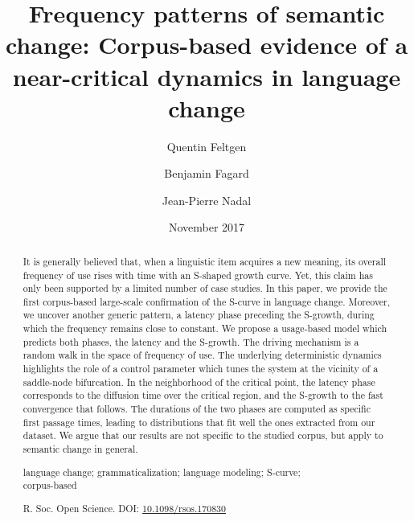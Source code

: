 \documentclass[12pt,twocolumn,amsmath,amssymb,aps,longbibliography]{revtex4-1}  %
\begin{document}

\title{Frequency patterns of semantic change: Corpus-based evidence of a near-critical dynamics in language change}

\author{Quentin Feltgen}

\author{Benjamin Fagard}

\author{Jean-Pierre Nadal}

\date{November 2017}

\begin{abstract}
It is generally believed that, when a linguistic item acquires a new meaning, its overall frequency of use rises with time with an S-shaped growth curve. Yet, this claim has only been supported by a limited number of case studies. In this paper, we provide the first corpus-based large-scale confirmation of the S-curve in language change. Moreover, we uncover another generic pattern, a latency phase preceding the S-growth, during which the frequency remains close to constant. We propose a usage-based model which predicts both phases, the latency and the S-growth. The driving mechanism is a random walk in the space of frequency of use. The underlying deterministic dynamics highlights the role of a control parameter which tunes the system at the vicinity of a saddle-node bifurcation. In the neighborhood of the critical point, the latency phase corresponds to the diffusion time over the critical region, and the S-growth to the fast convergence that follows. The durations of the two phases are computed as specific first passage times, leading to distributions that fit well the ones extracted from our dataset. We argue that our results are not specific to the studied corpus, but apply to semantic change in general.
\begin{description}
\small{\item[Keywords]language change; grammaticalization; language modeling; S-curve; \\ corpus-based
\item[Published 8 November 2017] R. Soc. Open Science. DOI: \href{https://doi.org/10.1098/rsos.170830}{10.1098/rsos.170830}}
\end{description}
\end{abstract}
\end{document}

